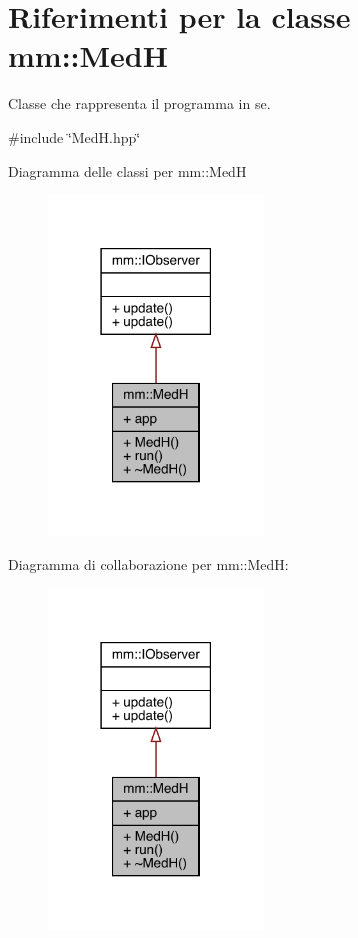 \hypertarget{classmm_1_1_med_h}{}\section{Riferimenti per la classe mm\+:\+:MedH}
\label{classmm_1_1_med_h}


Classe che rappresenta il programma in se.  




{\ttfamily \#include \char`\"{}Med\+H.\+hpp\char`\"{}}



Diagramma delle classi per mm\+:\+:MedH
\nopagebreak
\begin{figure}[H]
\begin{center}
\leavevmode
\includegraphics[width=162pt]{d3/d8f/classmm_1_1_med_h__inherit__graph}
\end{center}
\end{figure}


Diagramma di collaborazione per mm\+:\+:MedH\+:
\nopagebreak
\begin{figure}[H]
\begin{center}
\leavevmode
\includegraphics[width=162pt]{dc/d39/classmm_1_1_med_h__coll__graph}
\end{center}
\end{figure}
